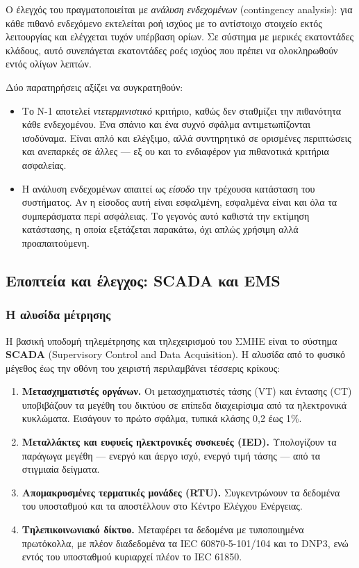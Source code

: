 Ο έλεγχός του πραγματοποιείται με \emph{ανάλυση ενδεχομένων} (contingency analysis): για
κάθε πιθανό ενδεχόμενο εκτελείται ροή ισχύος με το αντίστοιχο στοιχείο εκτός λειτουργίας
και ελέγχεται τυχόν υπέρβαση ορίων. Σε σύστημα με μερικές εκατοντάδες κλάδους, αυτό
συνεπάγεται εκατοντάδες ροές ισχύος που πρέπει να ολοκληρωθούν εντός ολίγων λεπτών.

Δύο παρατηρήσεις αξίζει να συγκρατηθούν:

\begin{itemize}
\item Το N-1 αποτελεί \emph{ντετερμινιστικό} κριτήριο, καθώς δεν σταθμίζει την πιθανότητα
      κάθε ενδεχομένου. Ένα σπάνιο και ένα συχνό σφάλμα αντιμετωπίζονται ισοδύναμα. Είναι
      απλό και ελέγξιμο, αλλά συντηρητικό σε ορισμένες περιπτώσεις και ανεπαρκές σε άλλες —
      εξ ου και το ενδιαφέρον για πιθανοτικά κριτήρια ασφαλείας.
\item Η ανάλυση ενδεχομένων απαιτεί ως \emph{είσοδο} την τρέχουσα κατάσταση του συστήματος.
      Αν η είσοδος αυτή είναι εσφαλμένη, εσφαλμένα είναι και όλα τα συμπεράσματα περί
      ασφάλειας. Το γεγονός αυτό καθιστά την εκτίμηση κατάστασης, η οποία εξετάζεται
      παρακάτω, όχι απλώς χρήσιμη αλλά προαπαιτούμενη.
\end{itemize}

\subsection{Εποπτεία και έλεγχος: SCADA και EMS}

\subsubsection*{Η αλυσίδα μέτρησης}

Η βασική υποδομή τηλεμέτρησης και τηλεχειρισμού του ΣΜΗΕ είναι το σύστημα \textbf{SCADA}
(Supervisory Control and Data Acquisition). Η αλυσίδα από το φυσικό μέγεθος έως την οθόνη
του χειριστή περιλαμβάνει τέσσερις κρίκους:

\begin{enumerate}
\item \textbf{Μετασχηματιστές οργάνων.} Οι μετασχηματιστές τάσης (VT) και έντασης (CT)
      υποβιβάζουν τα μεγέθη του δικτύου σε επίπεδα διαχειρίσιμα από τα ηλεκτρονικά
      κυκλώματα. Εισάγουν το πρώτο σφάλμα, τυπικά κλάσης 0,2 έως 1\%.
\item \textbf{Μεταλλάκτες και ευφυείς ηλεκτρονικές συσκευές (IED).} Υπολογίζουν τα παράγωγα
      μεγέθη — ενεργό και άεργο ισχύ, ενεργό τιμή τάσης — από τα στιγμιαία δείγματα.
\item \textbf{Απομακρυσμένες τερματικές μονάδες (RTU).} Συγκεντρώνουν τα δεδομένα του
      υποσταθμού και τα αποστέλλουν στο Κέντρο Ελέγχου Ενέργειας.
\item \textbf{Τηλεπικοινωνιακό δίκτυο.} Μεταφέρει τα δεδομένα με τυποποιημένα πρωτόκολλα,
      με πλέον διαδεδομένα τα IEC 60870-5-101/104 και το DNP3, ενώ εντός του υποσταθμού
      κυριαρχεί πλέον το IEC 61850.
\end{enumerate}

